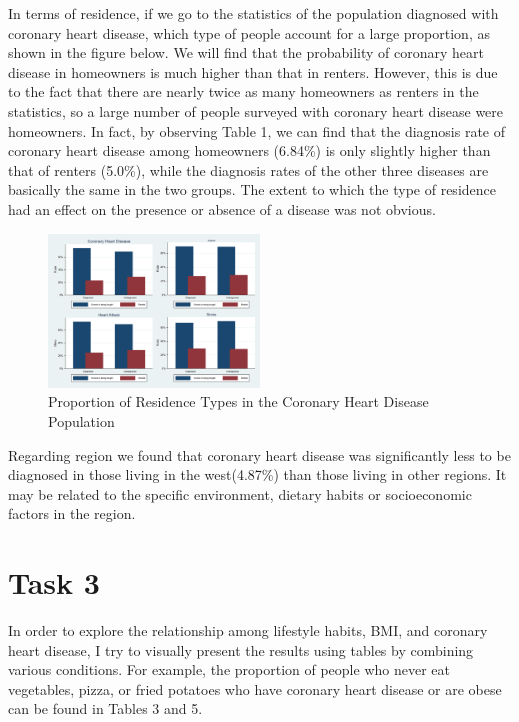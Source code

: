 \documentclass{article}
\begin{document}
In terms of residence, if we go to the statistics of the population diagnosed with coronary heart disease, which type of people account for a large proportion, as shown in the figure below. We will find that the probability of coronary heart disease in homeowners is much higher than that in renters. However, this is due to the fact that there are nearly twice as many homeowners as renters in the statistics, so a large number of people surveyed with coronary heart disease were homeowners. In fact, by observing Table 1, we can find that the diagnosis rate of coronary heart disease among homeowners (6.84\%) is only slightly higher than that of renters (5.0\%), while the diagnosis rates of the other three diseases are basically the same in the two groups. The extent to which the type of residence had an effect on the presence or absence of a disease was not obvious.


\begin{figure}[!h]
	\centering
	\includegraphics[width=0.5\textwidth]{../Image/Graph05.png}
	\caption{Proportion of Residence Types in the Coronary Heart Disease Population}
	\label{fig:G4}
\end{figure}

Regarding region we found that coronary heart disease was significantly less to be diagnosed in those living in the west(4.87\%) than those living in other regions. It may be related to the specific environment, dietary habits or socioeconomic factors in the region.

\newpage
\section{Task 3}
In order to explore the relationship among lifestyle habits, BMI, and coronary heart disease, I try to visually present the results using tables by combining various conditions. For example, the proportion of people who never eat vegetables, pizza, or fried potatoes who have coronary heart disease or are obese can be found in Tables 3 and 5.
\end{document}
